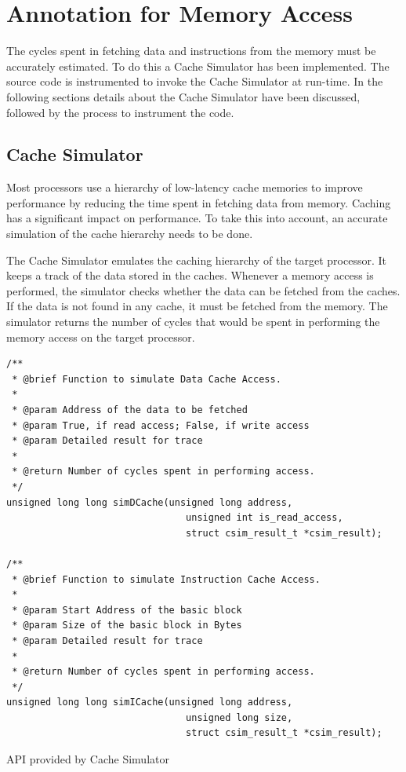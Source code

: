 \section{Annotation for Memory Access}
\label{sec:AnnotMemAccess}
The cycles spent in fetching data and instructions from the memory must be accurately estimated. To do this a Cache Simulator has been implemented. The source code is instrumented to invoke the Cache Simulator at run-time. In the following sections details about the Cache Simulator have been discussed, followed by the process to instrument the code.

\subsection{Cache Simulator}
Most processors use a hierarchy of low-latency cache memories to improve performance by reducing the time spent in fetching data from memory. Caching has a significant impact on performance. To take this into account, an accurate simulation of the cache hierarchy needs to be done.

The Cache Simulator emulates the caching hierarchy of the target processor. It keeps a track of the data stored in the caches. Whenever a memory access is performed, the simulator checks whether the data can be fetched from the caches. If the data is not found in any cache, it must be fetched from the memory. The simulator returns the number of cycles that would be spent in performing the memory access on the target processor.

\begin{Snippet}[h!]
\begin{lstlisting}[numbers=none]
/**
 * @brief Function to simulate Data Cache Access.
 *
 * @param Address of the data to be fetched
 * @param True, if read access; False, if write access
 * @param Detailed result for trace
 *
 * @return Number of cycles spent in performing access.
 */
unsigned long long simDCache(unsigned long address,
                                unsigned int is_read_access,
                                struct csim_result_t *csim_result);
                                
/**
 * @brief Function to simulate Instruction Cache Access.
 *
 * @param Start Address of the basic block
 * @param Size of the basic block in Bytes
 * @param Detailed result for trace 
 *
 * @return Number of cycles spent in performing access.
 */
unsigned long long simICache(unsigned long address,
                                unsigned long size,
                                struct csim_result_t *csim_result);
\end{lstlisting}
\caption{API provided by Cache Simulator}
\label{snip:csimAPI}
\end{Snippet}


